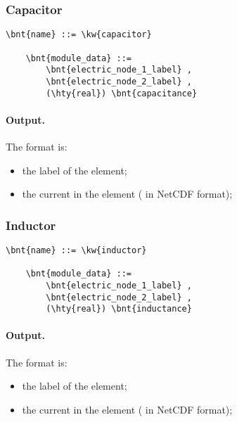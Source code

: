 \subsubsection{Capacitor}
\begin{Verbatim}[commandchars=\\\{\}]
    \bnt{name} ::= \kw{capacitor}

    \bnt{module_data} ::=
        \bnt{electric_node_1_label} ,
        \bnt{electric_node_2_label} ,
        (\hty{real}) \bnt{capacitance}
\end{Verbatim}

\paragraph{Output.}
\label{sec:MODULE:FAB-ELECTRIC:CAPACITOR:OUTPUT}
The format is:
\begin{itemize}
\item the label of the element;
\item the current in the element ( in NetCDF format);
\end{itemize}

\subsubsection{Inductor}
\begin{Verbatim}[commandchars=\\\{\}]
    \bnt{name} ::= \kw{inductor}

    \bnt{module_data} ::=
        \bnt{electric_node_1_label} ,
        \bnt{electric_node_2_label} ,
        (\hty{real}) \bnt{inductance}
\end{Verbatim}

\paragraph{Output.}
\label{sec:MODULE:FAB-ELECTRIC:INDUCTOR:OUTPUT}
The format is:
\begin{itemize}
\item the label of the element;
\item the current in the element ( in NetCDF format);
\end{itemize}

